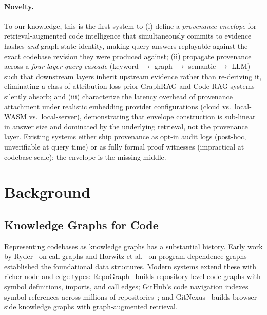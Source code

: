 \documentclass[conference]{IEEEtran}
\begin{document}
\paragraph{Novelty.}
To our knowledge, this is the first system to (i) define a
\emph{provenance envelope} for retrieval-augmented code intelligence
that simultaneously commits to evidence hashes \emph{and} graph-state
identity, making query answers replayable against the exact codebase
revision they were produced against; (ii) propagate provenance across a
\emph{four-layer query cascade} (keyword $\to$ graph $\to$ semantic
$\to$ LLM) such that downstream layers inherit upstream evidence rather
than re-deriving it, eliminating a class of attribution loss prior
GraphRAG and Code-RAG systems silently absorb; and (iii) characterize
the latency overhead of provenance attachment under realistic embedding
provider configurations (cloud vs.\ local-WASM vs.\ local-server),
demonstrating that envelope construction is sub-linear in answer size
and dominated by the underlying retrieval, not the provenance layer.
Existing systems either ship provenance as opt-in audit logs
(post-hoc, unverifiable at query time) or as fully formal proof
witnesses (impractical at codebase scale); the envelope is the missing
middle.


\section{Background}
\label{sec:background}

\subsection{Knowledge Graphs for Code}
\label{sec:background:kg}

Representing codebases as knowledge graphs has a substantial history.
Early work by Ryder~\cite{Ryder1979} on call graphs and
Horwitz et al.~\cite{Horwitz1990} on program dependence graphs
established the foundational data structures. Modern systems extend
these with richer node and edge types: RepoGraph~\cite{CodeGraph2025}
builds repository-level code graphs with symbol
definitions, imports, and call edges; GitHub's code navigation
indexes symbol references across millions of
repositories~\cite{GitHubCodeNav2023}; and
GitNexus~\cite{GitNexus2026} builds browser-side knowledge graphs
with graph-augmented retrieval.
\end{document}
